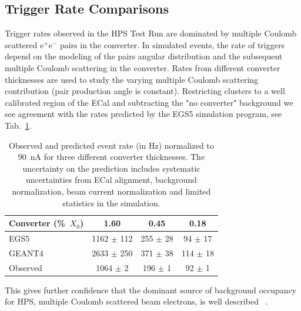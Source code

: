\documentclass[final,3p,times,twocolumn]{elsarticle}
\newcommand{\ee}{e$^+$e$^-$}
\newcommand{\egs}{{\sc EGS5}}
\newcommand{\moliere}{Moli\`{e}re}
\begin{document}
\subsection{Trigger Rate Comparisons}
\label{sec:mcs}
Trigger rates observed in the HPS Test Run are dominated by multiple Coulomb scattered \ee{} pairs in the 
converter. In simulated events, the rate of triggers depend on the modeling of the pairs angular 
distribution and the subsequent multiple Coulomb scattering in the converter. Rates from different 
converter 
thicknesses are used to study the varying multiple Coulomb scattering contribution (pair production 
angle is constant). Restricting clusters to a well calibrated region of the ECal and subtracting the 
"no converter" background we see agreement with the rates predicted by the \egs{} simulation 
program, see Tab.~\ref{tab:mcs}.
\begin{table}
{\small
\begin{tabular}{|l|c|c|c|}
\hline
\bf Converter (\%~$X_0$) & \bf 1.60 & \bf 0.45 &	\bf 0.18 \\
\hline
EGS5 &	1162 $\pm$ 112 &	255 $\pm$ 28 &	94 $\pm$ 17	\\
\hline
GEANT4 & 2633 $\pm$ 250 & 	371 $\pm$ 38 &	114 $\pm$ 18 \\
\hline
Observed 	& 1064 $\pm$ 2 & 196 $\pm$ 1 &	92 $\pm$ 1 \\						
\hline
\end{tabular}
\caption{ Observed and predicted event rate (in Hz) normalized to 90~nA for three different converter 
thicknesses. The uncertainty on the prediction includes systematic uncertainties from ECal alignment, background normalization, beam current normalization and limited statistics in the simulation.}
}
\label{tab:mcs}
\end{table}
This gives further confidence that the dominant source of background occupancy for HPS, multiple 
Coulomb scattered beam electrons, is well 
described~\cite{Attwood:2005zz,Shen:1978ha,Gottschalk1993467} . 
\end{document}
